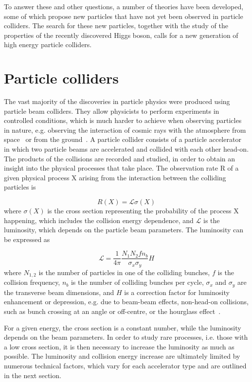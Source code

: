 To answer these and other questions, a number of theories have been developed, some of which propose new particles that have not yet been observed in particle colliders. The search for these new particles, together with the study of the properties of the recently discovered Higgs boson, calls for a new generation of high energy particle colliders.


\section[Particle colliders]{Particle colliders}

The vast majority of the discoveries in particle physics were produced using particle beam colliders. They allow physicists to perform experiments in controlled conditions, which is much harder to achieve when observing particles in nature, e.g. observing the interaction of cosmic rays with the atmosphere from space~\cite{Adams:2014xuv} or from the ground~\cite{ThePierreAuger:2015rma}. A particle collider consists of a particle accelerator in which two particle beams are accelerated and collided with each other head-on. The products of the collisions are recorded and studied, in order to obtain an insight into the physical processes that take place. The observation rate R of a given physical process X arising from the interaction between the colliding particles is

\begin{equation}
R(X) = \mathscr{L}\sigma(X)\label{eq:rate}
\end{equation}
where $\sigma(X)$ is the cross section representing the probability of the process X happening, which includes the collision energy dependence, and $\mathscr{L}$ is the luminosity, which depends on the particle beam parameters. The luminosity can be expressed as

\begin{equation}
\mathscr{L} = \frac{1}{4\pi} \frac{N_1 N_2 f n_b}{\sigma_x \sigma_y} H
\end{equation}
where $N_{1,2}$ is the number of particles in one of the colliding bunches, $f$ is the collision frequency, $n_b$ is the number of colliding bunches per cycle, $\sigma_x$ and $\sigma_y$ are the transverse beam dimensions, and $H$ is a correction factor for luminosity enhancement or depression, e.g. due to beam-beam effects, non-head-on collisions, such as bunch crossing at an angle or off-centre, or the hourglass effect~\cite{handbook_acc_phys}. 

For a given energy, the cross section is a constant number, while the luminosity depends on the beam parameters. In order to study rare processes, i.e. those with a low cross section, it is then necessary to increase the luminosity as much as possible. The luminosity and collision energy increase are ultimately limited by numerous technical factors, which vary for each accelerator type and are outlined in the next section.



